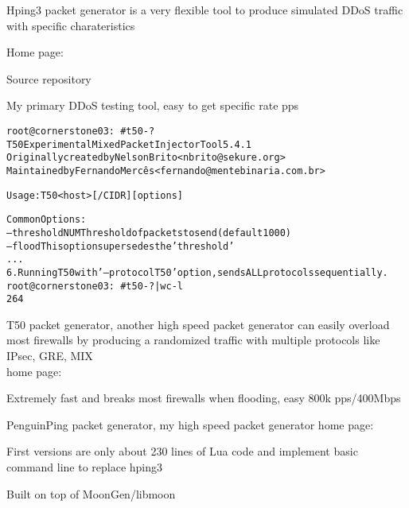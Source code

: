 \documentclass[Screen16to9,17pt]{foils}
\begin{document}
\begin{list2}
\item Hping3 packet generator is a very flexible tool to produce simulated DDoS traffic with specific charateristics
\item Home page: 
\item Source repository 
\end{list2}

\centerline{My primary DDoS testing tool, easy to get specific rate pps}




\begin{alltt}\footnotesize
root@cornerstone03:~# t50 -?
T50 Experimental Mixed Packet Injector Tool 5.4.1
Originally created by Nelson Brito <nbrito@sekure.org>
Maintained by Fernando Mercês <fernando@mentebinaria.com.br>

Usage: T50 <host> [/CIDR] [options]

Common Options:
    --threshold NUM        Threshold of packets to send     (default 1000)
    --flood                This option supersedes the 'threshold'
...
6. Running T50 with '--protocol T50' option, sends ALL protocols sequentially.
root@cornerstone03:~# t50 -? | wc -l
264
\end{alltt}

\begin{list2}
\item T50 packet generator, another high speed packet generator
can easily overload most firewalls by producing a randomized traffic with multiple protocols like IPsec, GRE, MIX \\
home page: 
\end{list2}

\centerline{Extremely fast and breaks most firewalls when flooding, easy 800k pps/400Mbps}




\begin{list2}
\item PenguinPing packet generator, my high speed packet generator
home page: 
\item First versions are only about 230 lines of Lua code and implement basic command line to replace hping3
\item Built on top of MoonGen/libmoon 
\end{list2}
\end{document}
